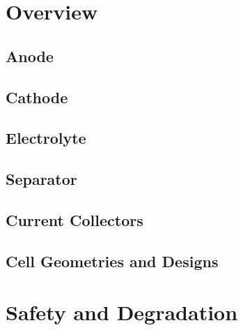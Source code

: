 

\section{Overview}
\label{sec:overview}

\subsection{Anode}
\label{sec:anode}

\subsection{Cathode}
\label{sec:cathode}

\subsection{Electrolyte}
\label{sec:electrolyte}

\subsection{Separator}
\label{sec:separator}

\subsection{Current Collectors}
\label{sec:current-collectors}

\subsection{Cell Geometries and Designs}
\label{sec:cell-geometries-designs}

\section{Safety and Degradation}
\label{sec:safety-degradation}
